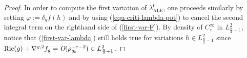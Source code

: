 \documentclass[a4paper,11pt,reqno]{amsart}
\newtheorem{coro}[defn]{Corollary}
\def\RR{\mathbb{R}}
\def\Ric{\mathop{\rm Ric}\nolimits}
\def\Ric{\mathop{\rm Ric}\nolimits}
\numberwithin{equation}{section}
\begin{document}
\begin{proof}
		 In order to compute the first variation of $\lambda_{\operatorname{ALE}}^0$, one proceeds similarly by setting $\varphi:=\delta_gf(h)$ and by using 
		(\ref{equ-criti-lambda-pot}) to cancel the second integral term on the righthand side of (\ref{first-var-F}). By density of $C_c^{\infty}$ in $L^2_{\frac{n}{2}-1}$, notice that (\ref{first-var-lambda}) still holds true for variations $h\in L^2_{\frac{n}{2}-1}$ since $\Ric(g)+\nabla^{g,2}f_g=\textit{O}(\rho_{g_b}^{-\tau-2})\in L^2_{\frac{n}{2}+1}$.
		
		
		
		
		
		
	\end{proof}
	
	
	
	
\end{document}
